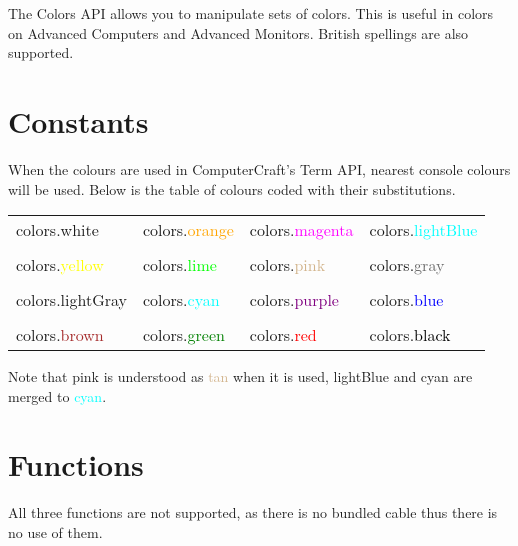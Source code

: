 The Colors API allows you to manipulate sets of colors. This is useful in colors on Advanced Computers and Advanced Monitors. British spellings are also supported.

\section{Constants}

When the colours are used in ComputerCraft's Term API, nearest console colours will be used. Below is the table of colours coded with their substitutions.

\begin{tabularx}{\textwidth}{l l l l}
	colors.white & colors.\textcolor{orange}{orange} & colors.\textcolor{magenta}{magenta} & colors.\textcolor{cyan}{lightBlue}
	\\ \\
	colors.\textcolor{yellow}{yellow} & colors.\textcolor{lime}{lime} & colors.\textcolor{tan}{pink} & colors.\textcolor{dimgrey}{gray}
	\\ \\
	colors.\textcolor{brightgrey}{lightGray} & colors.\textcolor{cyan}{cyan} & colors.\textcolor{purple}{purple} & colors.\textcolor{blue}{blue}
	\\ \\
	colors.\textcolor{brown}{brown} & colors.\textcolor{green}{green} & colors.\textcolor{red}{red} & colors.\textcolor{black}{black}
\end{tabularx}

Note that pink is understood as \textcolor{tan}{tan} when it is used, lightBlue and cyan are merged to \textcolor{cyan}{cyan}.

\section{Functions}

All three functions are not supported, as there is no bundled cable thus there is no use of them.